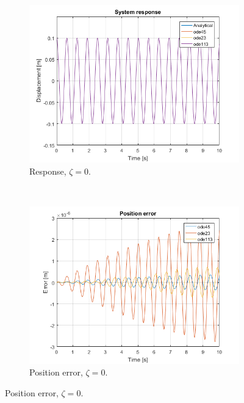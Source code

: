 \documentclass{article}
\begin{document}
	\clearpage
		\begin{figure}[h]
		\centering
		\begin{subfigure}[t]{0.45\textwidth}
			\includegraphics[width=\textwidth]{response_comparison_undamped.png}
			\caption{Response, $\zeta = 0$.}
		\end{subfigure}
		~
		\begin{subfigure}[t]{0.45\textwidth}
			\includegraphics[width=\textwidth]{error_comparison_damped.png}
			\caption{Position error, $\zeta = 0$.}
		\end{subfigure}
		

\end{figure}
\end{document}

